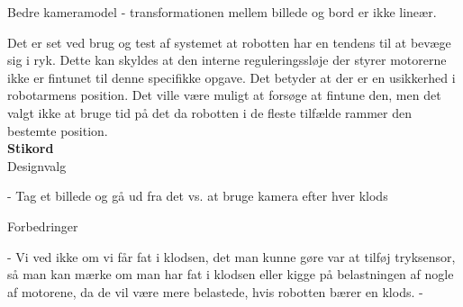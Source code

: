 Bedre kameramodel - transformationen mellem billede og bord er ikke lineær.\\ 

Det er set ved brug og test af systemet at robotten har en tendens til at bevæge sig i ryk. Dette kan skyldes at den interne reguleringssløje der styrer motorerne ikke er fintunet til denne specifikke opgave. Det betyder at der er en usikkerhed i robotarmens position. Det ville være muligt at forsøge at fintune den, men det valgt ikke at bruge tid på det da robotten i de fleste tilfælde rammer den bestemte position.\\


\textbf{Stikord}\\
Designvalg

 - Tag et billede og gå ud fra det vs. at bruge kamera efter hver klods

Forbedringer

 - Vi ved ikke om vi får fat i klodsen, det man kunne gøre var at tilføj tryksensor, så man kan mærke om man har fat i klodsen eller kigge på belastningen af nogle af motorene, da de vil være mere belastede, hvis robotten bærer en klods.
 - 
